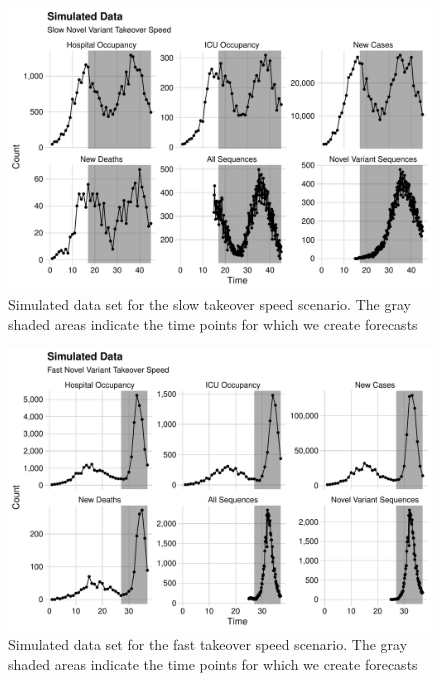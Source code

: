 \begin{figure}
    \centering
    \includegraphics[width=1.0\columnwidth]{simulated_binned_data_slow_plot}
    \caption[Simulated data set for the slow takeover speed scenario.]{Simulated data set for the slow takeover speed scenario.
    The gray shaded areas indicate the time points for which we create forecasts}
    \label{ch_5:fig:simulated_binned_data_slow_plot}
\end{figure}

\begin{figure}
    \centering
    \includegraphics[width=1.0\columnwidth]{simulated_binned_data_fast_plot}
    \caption[Simulated data set for the fast takeover speed scenario.]{Simulated data set for the fast takeover speed scenario.
    The gray shaded areas indicate the time points for which we create forecasts}
    \label{ch_5:fig:simulated_binned_data_fast_plot}
\end{figure}

